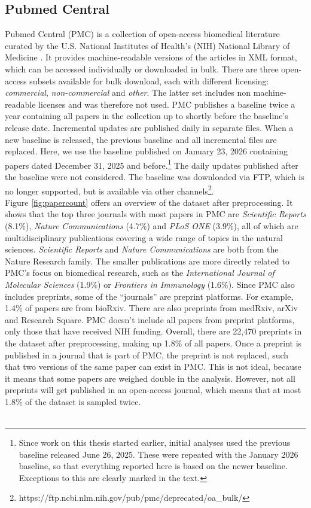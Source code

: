 \subsection{Pubmed Central}
Pubmed Central (PMC) is a collection of open-access biomedical literature curated by the U.S. National Institutes of Health's (NIH) National Library of Medicine \cite{pmc}. 
It provides machine-readable versions of the articles in XML format, which can be accessed individually or downloaded in bulk.
There are three open-access subsets available for bulk download, each  with different licensing: \emph{commercial}, \emph{non-commercial} and \emph{other}.
The latter set includes non machine-readable licenses and was therefore not used.
PMC publishes a baseline twice a year containing all papers in the collection up to shortly before the baseline's release date. 
Incremental updates are published daily in separate files.
When a new baseline is released, the previous baseline and all incremental files are replaced.
Here, we use the baseline published on January 23, 2026 containing papers dated December 31, 2025 and before.\footnote{Since work on this thesis started earlier, initial analyses used the previous baseline released June 26, 2025. These were repeated with the January 2026 baseline, so that everything reported here is based on the newer baseline. Exceptions to this are clearly marked in the text.}
The daily updates published after the baseline were not considered.
The baseline was downloaded via FTP, which is no longer supported, but is available via other channels\footnote{https://ftp.ncbi.nlm.nih.gov/pub/pmc/deprecated/oa\_bulk/}.
\\
Figure \ref{fig:papercount} offers an overview of the dataset after preprocessing.
It shows that the top three journals with most papers in PMC are \emph{Scientific Reports} (8.1\%), \emph{Nature Communications} (4.7\%) and \emph{PLoS ONE} (3.9\%), all of which are multidisciplinary publications covering a wide range of topics in the natural sciences. 
\emph{Scientific Reports} and \emph{Nature Communications} are both from the Nature Research family.
The smaller publications are more directly related to PMC's focus on biomedical research, such as the \emph{International Journal of Molecular Sciences} (1.9\%) or \emph{Frontiers in Immunology} (1.6\%).
Since PMC also includes preprints, some of the ``journals'' are preprint platforms.
For example, 1.4\% of papers are from bioRxiv.
There are also preprints from medRxiv, arXiv and Research Square.
PMC doesn't include all papers from preprint platforms, only those that have received NIH funding.
Overall, there are 22,470 preprints in the dataset after preprocessing, making up 1.8\% of all papers.
Once a preprint is published in a journal that is part of PMC, the preprint is not replaced, such that two versions of the same paper can exist in PMC. 
This is not ideal, because it means that some papers are weighed double in the analysis.
However, not all preprints will get published in an open-access journal, which means that at most 1.8\% of the dataset is sampled twice.
\\\\

